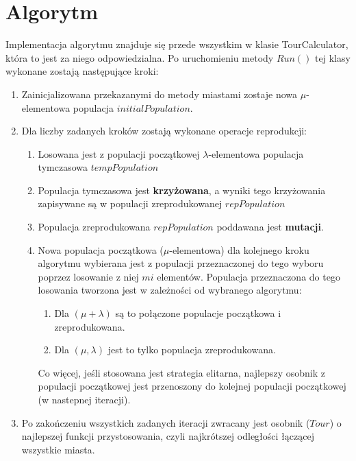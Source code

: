 \documentclass[11pt]{article}
\begin{document}
\section{Algorytm}
Implementacja algorytmu znajduje się przede wszystkim w klasie TourCalculator, która to jest za niego odpowiedzialna. Po uruchomieniu metody $Run()$ tej klasy wykonane zostają następujące kroki:
\begin{enumerate}
\item Zainicjalizowana przekazanymi do metody miastami zostaje nowa $\mu$-elementowa populacja $initialPopulation$.
\item Dla liczby zadanych kroków zostają wykonane operacje reprodukcji:
	\begin{enumerate}
	\item Losowana jest z populacji początkowej $\lambda$-elementowa populacja tymczasowa $tempPopulation$
	\item Populacja tymczasowa jest \textbf{krzyżowana}, a wyniki tego krzyżowania zapisywane są w populacji zreprodukowanej $repPopulation$
	\item Populacja zreprodukowana $repPopulation$ poddawana jest \textbf{mutacji}.
	\item Nowa populacja początkowa ($\mu$-elementowa) dla kolejnego kroku algorytmu wybierana jest z populacji przeznaczonej do tego wyboru poprzez losowanie z niej $mi$ elementów. Populacja przeznaczona do tego losowania tworzona jest w zależności od wybranego algorytmu:
		\begin{enumerate}
		\item Dla $(\mu + \lambda)$ są to połączone populacje początkowa i zreprodukowana.
		\item Dla $(\mu, \lambda)$ jest to tylko populacja zreprodukowana.
		\end{enumerate}
	Co więcej, jeśli stosowana jest strategia elitarna, najlepszy osobnik z populacji początkowej jest przenoszony do kolejnej populacji początkowej (w nastepnej iteracji).
	\end{enumerate}
	\item Po zakończeniu wszystkich zadanych iteracji zwracany jest osobnik ($Tour$) o najlepszej funkcji przystosowania, czyli najkrótszej odległości łączącej wszystkie miasta.
\end{enumerate}
\end{document}
